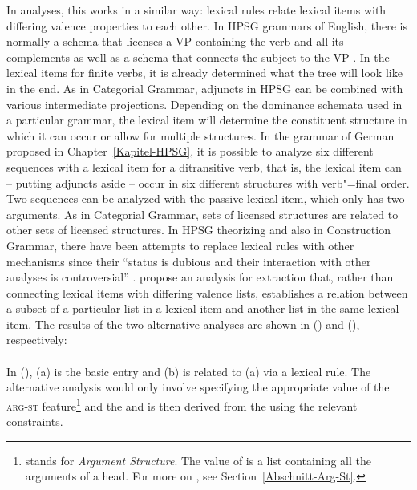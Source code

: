 In \hpsg analyses\indexhpsg, this works in a similar way: lexical rules relate lexical items with differing valence properties to each other. In HPSG grammars of English,
there is normally a schema that licenses a VP containing the verb and all its complements as well as a schema that connects the subject to the VP 
\citep[]{ps2}. In the lexical items for finite verbs, it is already determined what the tree will look like in the end. As in Categorial Grammar, adjuncts in HPSG can
be combined with various intermediate projections. Depending on the dominance schemata used in a particular grammar, the lexical item will determine the constituent structure
in which it can occur or allow for multiple structures. In the grammar of German proposed in Chapter~\ref{Kapitel-HPSG}, it is possible to analyze six different sequences with a lexical
item for a ditransitive verb, that is, the lexical item can -- putting adjuncts aside -- occur in six different structures with verb"=final order. Two sequences can be analyzed
with the passive lexical item, which only has two arguments.
As in Categorial Grammar, sets of licensed structures are related to other sets of licensed structures. In HPSG theorizing and also in Construction Grammar, there have been
attempts to replace lexical rules with other mechanisms since their ``status is dubious and their interaction with other analyses is controversial''
\citep*[]{BMS2001a}. \citet{BMS2001a} propose an analysis for extraction
that, rather than connecting lexical items with differing valence lists, establishes a relation between a subset of a particular list in a lexical item and another
list in the same lexical item. The results of the two alternative analyses are shown in ()
and (), respectively:
\eal
\ex {}\\
\ex {}\\
\zl
In (), (a) is the basic entry and (b) is related to (a) via a lexical
rule. The alternative analysis would only involve specifying the appropriate value
of the \textsc{arg-st} feature\footnote{
\argst stands for \emph{Argument Structure}. The value of \argst is a list containing all the arguments
of a head. For more on \argst, see Section~\ref{Abschnitt-Arg-St}.
} and the \subcat and \slashv is then derived from the \argstv using the relevant constraints.
